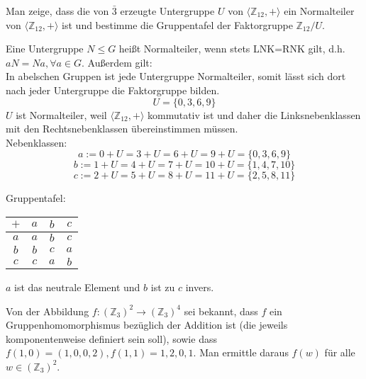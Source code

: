 \documentclass[a4paper, 12pt, margins=3cm]{homework}
\newcommand{\Z}{\mathbb{Z}}
\begin{document}
  \begin{problem}
    Man zeige, dass die von $\bar{3}$ erzeugte Untergruppe $U$ von $\langle \Z_{12}, +\rangle$
    ein Normalteiler von $\langle \Z_{12}, +\rangle$ ist und bestimme die Gruppentafel
    der Faktorgruppe $\Z_{12}/U$.
  \end{problem}
  \begin{solution}\hfill
    Eine Untergruppe $N\leq G$ heißt Normalteiler, wenn stets LNK=RNK gilt, d.h.
    $aN = Na, \forall a\in G$. Außerdem gilt:\\

    In abelschen Gruppen ist jede Untergruppe Normalteiler, somit lässt sich dort
    nach jeder Untergruppe die Faktorgruppe bilden.\\

    \[ U = \{0,3,6,9\} \]
    $U$ ist Normalteiler, weil $\langle \Z_{12}, +\rangle$ kommutativ ist und daher
    die Linksnebenklassen mit den Rechtsnebenklassen übereinstimmen müssen.\\

    Nebenklassen:
      \[ a := 0+U = 3+U = 6+U = 9+U = \{0,3,6,9\} \]
      \[ b := 1+U = 4+U = 7+U = 10+U = \{1,4,7,10\} \]
      \[ c := 2+U = 5+U = 8+U = 11+U = \{2,5,8,11\} \]

    Gruppentafel:
      \begin{center}
        \begin{tabular}{c|ccc}
         $+$ & $a$ & $b$ & $c$ \\ \hline
         $a$ & $a$ & $b$ & $c$ \\
         $b$ & $b$ & $c$ & $a$ \\
         $c$ & $c$ & $a$ & $b$ \\        
        \end{tabular}
      \end{center}
    $a$ ist das neutrale Element und $b$ ist zu $c$ invers.
  \end{solution}


  \begin{problem}
    Von der Abbildung $f:(\Z_3)^2 \rightarrow (\Z_3)^4$ sei bekannt, dass $f$ ein
    Gruppenhomomorphismus bezüglich der Addition ist (die jeweils komponentenweise
    definiert sein soll), sowie dass $f(1,0)=(1,0,0,2), f(1,1)=1,2,0,1$. Man ermittle
    daraus $f(w)$ für alle $w\in (\Z_3)^2$.
  \end{problem}
  \begin{solution}
    
  \end{solution}
\end{document}
